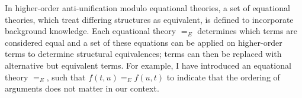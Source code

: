 %
%

In higher-order anti-unification modulo equational theories, a set of equational theories, which treat differing structures as equivalent, is defined to incorporate background knowledge. Each equational theory $=_E$ determines which terms are considered equal and a set of these equations can be applied on higher-order terms to determine structural equivalences; terms can then be replaced with alternative but equivalent terms. For example, I have introduced an equational theory $=_E$, such that $f(t,u) =_E f(u,t)$ to indicate that the ordering of arguments does not matter in our context.

